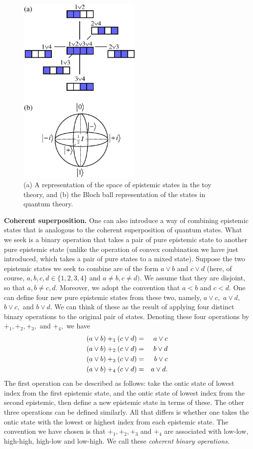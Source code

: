 \documentclass[pra,twocolumn,nofootinbib,showpacs]{revtex4}
\begin{document}
\begin{figure}[h]
\includegraphics[width=60mm]{Blochspherevertical.eps}
\caption{(a) A representation of the space of epistemic states in the toy
theory, and (b) the Bloch ball representation of the states in quantum
theory.}
\label{Blochsphere}
\end{figure}

\textbf{Coherent superposition.} One can also introduce a way of combining
epistemic states that is analogous to the coherent superposition of quantum
states. What we seek is a binary operation that takes a pair of pure
epistemic state to another pure epistemic state (unlike the operation of
convex combination we have just introduced, which takes a pair of pure
states to a mixed state). Suppose the two epistemic states we seek to
combine are of the form $a\vee b$ and $c\vee d$ (here, of course, $%
a,b,c,d\in \{1,2,3,4\}$ and $a\ne b,c\ne d).$ We assume that they are
disjoint, so that $a,b\ne c,d.$ Moreover, we adopt the convention that $a<b$
and $c<d.$ One can define four new pure epistemic states from these two,
namely, $a\vee c,$ $a\vee d,$ $b\vee c,$ and $b\vee d. $ We can think of
these as the result of applying four distinct binary operations to the
original pair of states. Denoting these four operations by $%
+_{1},+_{2},+_{3},$ and $+_{4},$ we have
\begin{eqnarray}
(a\vee b)+_{1}(c\vee d) &=&a\vee c  \notag \\
(a\vee b)+_{2}(c\vee d) &=&b\vee d  \notag \\
(a\vee b)+_{3}(c\vee d) &=&b\vee c  \notag \\
(a\vee b)+_{4}(c\vee d) &=&a\vee d.
\end{eqnarray}
The first operation can be described as follows: take the ontic state of
lowest index from the first epistemic state, and the ontic state of lowest
index from the second epistemic, then define a new epistemic state in terms
of these. The other three operations can be defined similarly. All that
differs is whether one takes the ontic state with the lowest or highest
index from each epistemic state. The convention we have chosen is that $%
+_{1},+_{2},+_{3}$ and $+_{4}$ are associated with low-low, high-high,
high-low and low-high. We call these \emph{coherent binary operations.}
\end{document}
